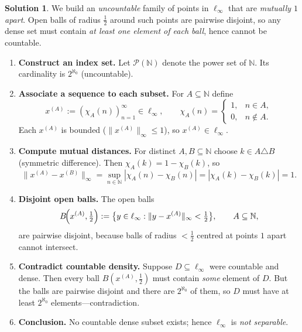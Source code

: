\documentclass[12pt]{article}
\theoremstyle{definition} %
\newtheorem{solution}{Solution}
\theoremstyle{plain} %
\begin{document}
      \begin{solution}
      We build an \emph{uncountable} family of points in $\ell_\infty$ that are
      \emph{mutually $1$ apart}.  
      Open balls of radius $\tfrac12$ around such points are pairwise disjoint,
      so any dense set must contain \emph{at least one element of each ball},
      hence cannot be countable.
      
      \begin{enumerate}[]
      \item \textbf{Construct an index set.}
            Let $\mathcal{P}(\mathbb{N})$ denote the power set of $\mathbb{N}$.
            Its cardinality is $2^{\aleph_0}$ (uncountable).
      
      \item \textbf{Associate a sequence to each subset.}
            For $A\subseteq\mathbb{N}$ define
            \[
               x^{(A)} := (\chi_A(n))_{n=1}^\infty\in\ell_\infty,
               \qquad
               \chi_A(n)=
               \begin{cases}
                 1,& n\in A,\\[2pt]
                 0,& n\notin A.
               \end{cases}
            \]
            Each $x^{(A)}$ is bounded ($\|x^{(A)}\|_\infty\le 1$), so
            $x^{(A)}\in\ell_\infty$.
      
      \item \textbf{Compute mutual distances.}
            For distinct $A,B\subseteq\mathbb{N}$ choose $k\in A\triangle B$
            (symmetric difference).  
            Then $\chi_A(k)=1-\chi_B(k)$, so
            \[
              \|x^{(A)}-x^{(B)}\|_\infty
              =\sup_{n\in\mathbb{N}} |\chi_A(n)-\chi_B(n)|
              =|\chi_A(k)-\chi_B(k)| = 1 .
            \]
      
      \item \textbf{Disjoint open balls.}
            The open balls
            \[
                B\!\Bigl(x^{(A)},\tfrac12\Bigr)
                :=\bigl\{y\in\ell_\infty:\|y-x^{(A)}\|_\infty<\tfrac12\bigr\},
                \qquad A\subseteq\mathbb{N},
            \]
            are pairwise disjoint, because balls of radius $<\tfrac12$ centred
            at points $1$ apart cannot intersect.
      
      \item \textbf{Contradict countable density.}
            Suppose $D\subseteq\ell_\infty$ were countable and dense.  
            Then every ball $B(x^{(A)},\tfrac12)$ must contain \emph{some}
            element of $D$.  
            But the balls are pairwise disjoint and there are
            $2^{\aleph_0}$ of them, so $D$ must have at least
            $2^{\aleph_0}$ elements—contradiction.
      
      \item \textbf{Conclusion.}
            No countable dense subset exists; hence
            $\ell_\infty$ is \emph{not separable}.
      \end{enumerate}
      \end{solution}
\end{document}
